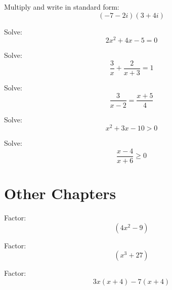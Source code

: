 \documentclass[fleqn,addpoints]{exam}
\begin{document}
\begin{questions}
\question 
Multiply and write in standard form:
\[
  (-7 - 2i)(3 + 4i)
\]
\vspace{2 cm}

\question 
Solve:
\[
  2x^2 + 4x - 5 = 0
\]
\vspace{2 cm}

\question 
Solve:
\[
  \frac{3}{x} + \frac{2}{x+3} = 1
\]
\vspace{2 cm}

\question 
Solve:
\[
  \frac{3}{x-2} = \frac{x+5}{4}
\]
\vspace{2 cm}

\question 
Solve:
\[
  x^2 + 3x - 10 > 0
\]
\vspace{2 cm}

\question 
Solve:
\[
  \frac{x-4}{x+6} \geq 0
\]
\vspace{2 cm}

\section{Other Chapters}

\question
Factor:
\[
  (4x^2 - 9)
\]
\vspace{1 cm}

\question
Factor:
\[
  (x^3 + 27)
\]
\vspace{1 cm}


\question
Factor:
\[
  3x(x+4) - 7(x+4)
\]
\vspace{1 cm}




\end{questions}
\end{document}
